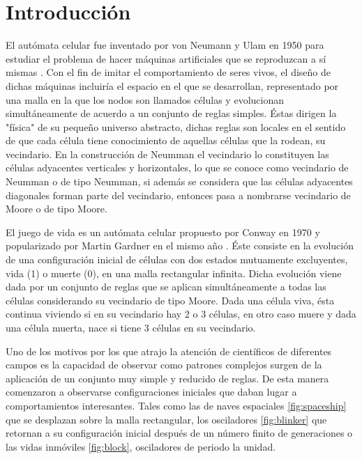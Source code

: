 \documentclass[../proyecto.tex]{book}
\begin{document}
\chapter{Introducción}

El autómata celular fue inventado por von Neumann y Ulam en 1950 para estudiar el problema de hacer máquinas artificiales que se reproduzcan a sí mismas \cite{neummanUlam}. Con el fin de imitar el comportamiento de seres vivos, el diseño de dichas máquinas incluiría el espacio en el que se desarrollan, representado por una malla en la que los nodos son llamados células y evolucionan simultáneamente de acuerdo a un conjunto de reglas simples. Éstas dirigen la "física" de su pequeño universo abstracto, dichas reglas son locales en el sentido de que cada célula tiene conocimiento de aquellas células que la rodean, su vecindario. En la construcción de Neumman el vecindario lo constituyen las células adyacentes verticales y horizontales, lo que se conoce como vecindario de Neumman o de tipo Neumman, si además se considera que las células adyacentes diagonales forman parte del vecindario, entonces pasa a nombrarse vecindario de Moore o de tipo Moore.

El juego de vida es un autómata celular propuesto por Conway en 1970 y popularizado por Martin Gardner en el mismo año \cite{primerap}. Éste consiste en la evolución de una configuración inicial de células con dos estados mutuamente excluyentes, vida (1) o muerte (0), en una malla rectangular infinita. Dicha evolución viene dada por un conjunto de reglas que se aplican simultáneamente a todas las células considerando su vecindario de tipo Moore. Dada una célula viva, ésta continua viviendo si en su vecindario hay 2 o 3 células, en otro caso muere y dada una célula muerta, nace si tiene 3 células en su vecindario.

Uno de los motivos por los que atrajo la atención de científicos de diferentes campos es la capacidad de observar como patrones complejos surgen de la aplicación de un conjunto muy simple y reducido de reglas. De esta manera comenzaron a observarse configuraciones iniciales que daban lugar a comportamientos interesantes. Tales como las de naves espaciales \ref{fig:spaceship} que se desplazan sobre la malla rectangular, los osciladores \ref{fig:blinker} que retornan a su configuración inicial después de un número finito de generaciones o las vidas inmóviles \ref{fig:block}, osciladores de periodo la unidad.
\end{document}
